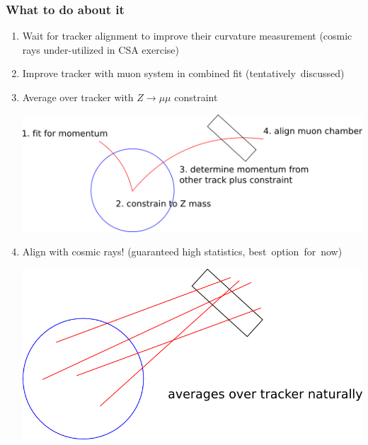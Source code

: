 \documentclass[compress]{beamer}
\begin{document}
\begin{frame}
\frametitle{What to do about it}
\small

\begin{enumerate}
\item Wait for tracker alignment to improve their curvature measurement (cosmic rays under-utilized in CSA exercise)
\item Improve tracker with muon system in combined fit \mbox{(tentatively discussed)\hspace{-1 cm}}
\item Average over tracker with $Z\to\mu\mu$ constraint

\begin{center}
\includegraphics[height=2.3 cm]{Zmass_constraint.png}
\end{center}

\item Align with cosmic rays! (guaranteed high statistics, \mbox{best option for now)\hspace{-1 cm}}

\begin{center}
\includegraphics[height=2.3 cm]{cosmics_alignment.png}
\end{center}
\end{enumerate}

\end{frame}
\end{document}

